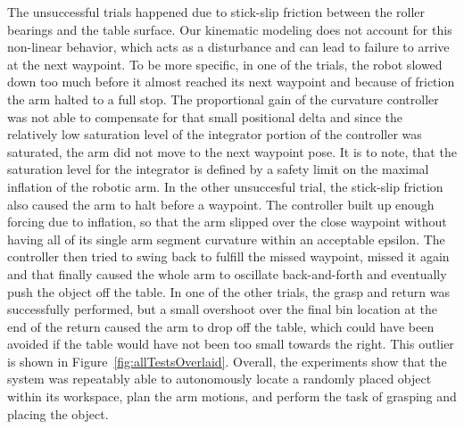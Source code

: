 The unsuccessful trials happened due to stick-slip friction between the roller bearings and the table surface.
Our kinematic modeling does not account for this non-linear behavior, which acts as a disturbance and can lead to failure to arrive at the next waypoint.
To be more specific, in one of the trials, the robot slowed down too much before it almost reached its next waypoint and because of friction the arm halted to a full stop. 
The proportional gain of the curvature controller was not able to compensate for that small positional delta and since the relatively low saturation level of the integrator portion of the controller was saturated, the arm did not move to the next waypoint pose. 
It is to note, that the saturation level for the integrator is defined by a safety limit on the maximal inflation of the robotic arm.
In the other unsuccesful trial, the stick-slip friction also caused the arm to halt before a waypoint. The controller built up enough forcing due to inflation, so that the arm slipped over the close waypoint without having all of its single arm segment curvature within an acceptable epsilon.
The controller then tried to swing back to fulfill the missed waypoint, missed it again and that finally caused the whole arm to oscillate back-and-forth and eventually push the object off the table.
In one of the other trials, the grasp and return was successfully performed, but a small overshoot over the final bin location at the end of the return caused the arm to drop off the table, which could have been avoided if the table would have not been too small towards the right.
This outlier is shown in Figure~\ref{fig:allTestsOverlaid}.
Overall, the experiments show that the system was repeatably able to autonomously locate a randomly placed object within its workspace, plan the arm motions, and perform the task of grasping and placing the object.

